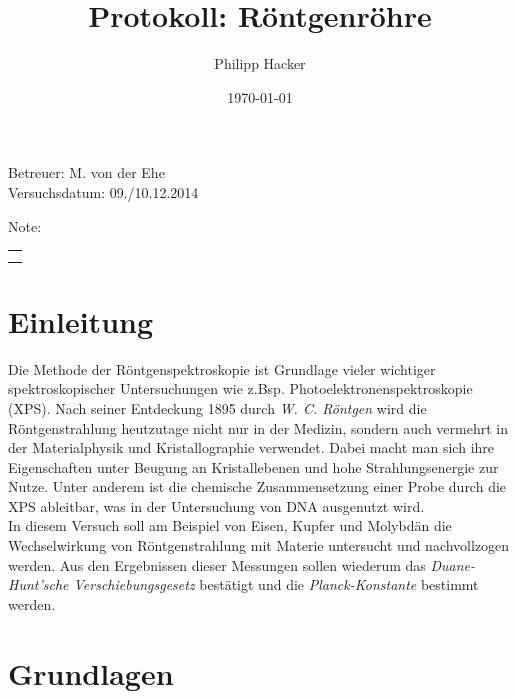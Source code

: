 \documentclass[numbers=noenddot,12pt,a4paper]{scrartcl}
\title{Protokoll: Röntgenröhre} %
\author{Philipp Hacker} %
\date{\today}
\newcommand{\tilt}[1]{\textit{#1}}
\begin{document}
\maketitle
\begin{center}
Betreuer: M. von der Ehe\\ %
Versuchsdatum: 09./10.12.2014\\ %
\begin{table}[h]
\centering
Note: %
\begin{tabularx}{1.5cm}{|X|}
\hline \\ \\
\hline
\end{tabularx}
\end{table}
\end{center}
\vspace*{\fill}
\tableofcontents
\vfill
\newpage
\section{Einleitung}
Die Methode der Röntgenspektroskopie ist Grundlage vieler wichtiger spektroskopischer Untersuchungen wie z.Bsp. Photoelektronenspektroskopie (XPS). Nach seiner Entdeckung 1895 durch \tilt{W. C. Röntgen} wird die Röntgenstrahlung heutzutage nicht nur in der Medizin, sondern auch vermehrt in der Materialphysik und Kristallographie  verwendet. Dabei macht man sich ihre Eigenschaften unter Beugung an Kristallebenen und hohe Strahlungsenergie zur Nutze. Unter anderem ist die chemische Zusammensetzung einer Probe durch die XPS ableitbar, was in der Untersuchung von DNA ausgenutzt wird.\\
In diesem Versuch soll am Beispiel von Eisen, Kupfer und Molybdän die Wechselwirkung von Röntgenstrahlung mit Materie untersucht und nachvollzogen werden. Aus den Ergebnissen dieser Messungen sollen wiederum das \tilt{Duane-Hunt'sche Verschiebungsgesetz} bestätigt und die \tilt{Planck-Konstante} bestimmt werden.
\newpage
\section{Grundlagen}
\end{document}
